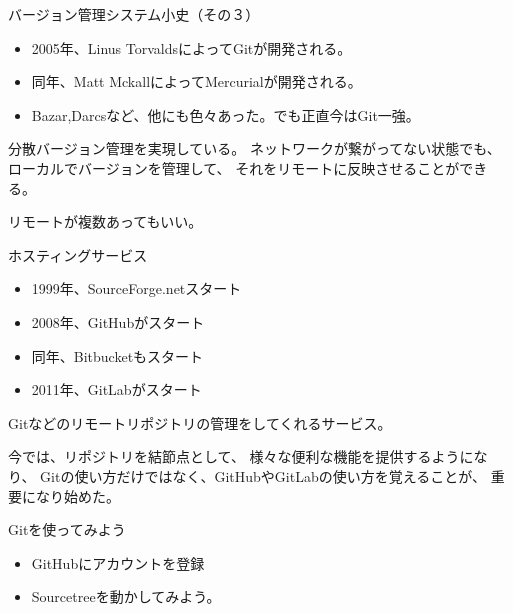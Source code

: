\documentclass[12pt, unicode]{beamer}
\begin{document}
\begin{frame}{バージョン管理システム小史（その３）}
\begin{itemize}
\item 2005年、Linus TorvaldsによってGitが開発される。
\item 同年、Matt MckallによってMercurialが開発される。
\item Bazar,Darcsなど、他にも色々あった。でも正直今はGit一強。
\end{itemize}

分散バージョン管理を実現している。
ネットワークが繋がってない状態でも、
ローカルでバージョンを管理して、
それをリモートに反映させることができる。

リモートが複数あってもいい。

\end{frame}
\begin{frame}{ホスティングサービス}
\begin{itemize}
\item 1999年、SourceForge.netスタート
\item 2008年、GitHubがスタート
\item 同年、Bitbucketもスタート
\item 2011年、GitLabがスタート
\end{itemize}

Gitなどのリモートリポジトリの管理をしてくれるサービス。

今では、リポジトリを結節点として、
様々な便利な機能を提供するようになり、
Gitの使い方だけではなく、GitHubやGitLabの使い方を覚えることが、
重要になり始めた。


\end{frame}
\begin{frame}{Gitを使ってみよう}

\begin{itemize}
\item GitHubにアカウントを登録
\item Sourcetreeを動かしてみよう。
\end{itemize}

\end{frame}
\end{document}
